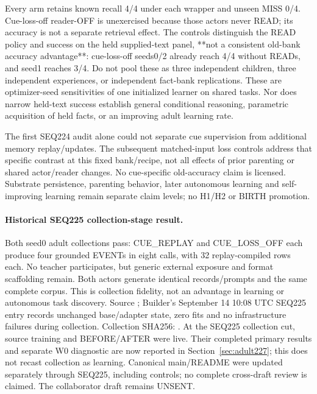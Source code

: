 \documentclass[11pt]{article}
\begin{document}
Every arm retains known recall 4/4 under each wrapper and unseen MISS 0/4.
Cue-loss-off reader-OFF is unexercised because those actors never READ; its
accuracy is not a separate retrieval effect. The controls distinguish the
READ policy and success on the held supplied-text panel, **not a consistent
old-bank accuracy advantage**: cue-loss-off seeds0/2 already reach 4/4 without
READs, and seed1 reaches 3/4. Do not pool these as three independent children,
three independent experiences, or independent fact-bank replications. These
are optimizer-seed sensitivities of one initialized learner on shared tasks.
Nor does narrow held-text success establish general conditional reasoning,
parametric acquisition of held facts, or an improving adult learning rate.

The first SEQ224 audit alone could not separate cue supervision from additional
memory replay/updates. The subsequent matched-input loss controls address that
specific contrast at this fixed bank/recipe, not all effects of prior parenting
or shared actor/reader changes. No cue-specific old-accuracy claim is licensed.
Substrate persistence, parenting behavior, later autonomous learning and
self-improving learning remain separate claim levels; no H1/H2 or BIRTH promotion.
\paragraph{Historical SEQ225 collection-stage result.}
Both seed0 adult collections pass: CUE\_REPLAY and CUE\_LOSS\_OFF each produce
four grounded EVENTs in eight calls, with 32 replay-compiled rows each.
No teacher participates, but generic external exposure and format scaffolding
remain. Both actors generate identical records/prompts and the same complete
corpus. This is collection fidelity, not an advantage in learning or autonomous
task discovery. Source ; Builder's September 14 10:08 UTC
SEQ225 entry records unchanged base/adapter state, zero fits and no infrastructure
failures during collection. Collection SHA256:
.
At the SEQ225 collection cut, source  training and BEFORE/AFTER
were live. Their completed primary results and separate W0 diagnostic are now
reported in Section~\ref{sec:adult227}; this does not recast collection as learning.
Canonical main/README were updated separately through SEQ225, including controls;
no complete cross-draft review is claimed. The collaborator draft remains UNSENT.
\end{document}
